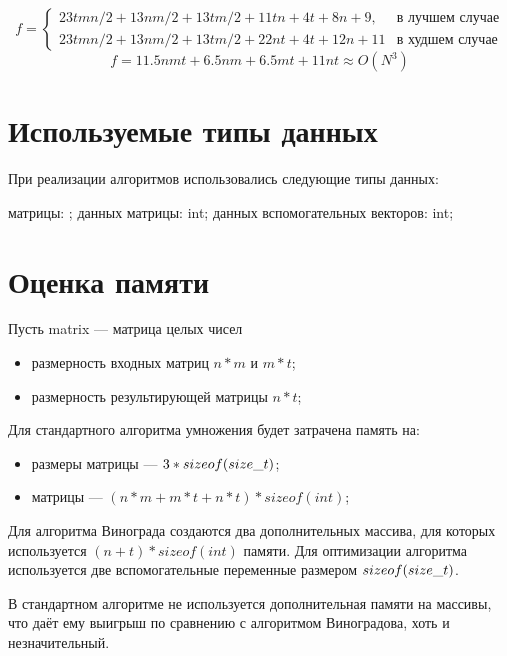 \begin{equation}\label{eq:if_complexity}
	f = \begin{cases}
		23tmn/2 + 13nm/2 + 13tm/2 + 11tn + 4t + 8n + 9, & \text{в лучшем случае} \\
		23tmn/2 + 13nm/2 + 13tm/2 + 22nt + 4t + 12n + 11 & \text{в худшем случае}
	\end{cases}
\end{equation}
\begin{equation}f = 11.5nmt + 6.5nm + 6.5mt + 11 nt \approx O(N^3) \end{equation}

\section{Используемые типы данных}
При реализации алгоритмов использовались следующие типы данных:
\begin{itemize}
	 матрицы: ;
	 данных матрицы: int;
	 данных вспомогательных векторов: int;
\end{itemize}

\section{Оценка памяти}
Пусть matrix — матрица целых чисел
\begin{itemize}
\item размерность входных матриц \( n * m\) и \(m * t\);
\item размерность результирующей матрицы \(n * t\);
\end{itemize}
Для стандартного алгоритма умножения будет затрачена память на:
\begin{itemize}
\item размеры матрицы — \(3 * sizeof\text(size\_t)\);
\item матрицы —  \((n* m + m * t + n * t) * sizeof(int)\);
\end{itemize}
Для алгоритма Винограда создаются два дополнительных массива, для
которых используется \((n + t) * sizeof(int)\) памяти. Для оптимизации алгоритма используется две вспомогательные переменные размером \(sizeof\text(size\_t)\).

В стандартном алгоритме не используется дополнительная памяти на массивы, что даёт ему выигрыш по сравнению с алгоритмом Виноградова, хоть и незначительный.

